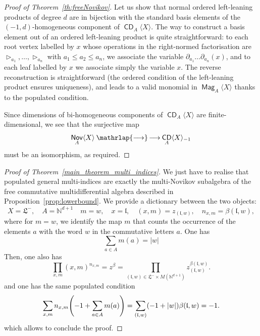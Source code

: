 \documentclass[AHL,Unicode,longabstracts]{cedram}
\newcommand{\mfl}{\mathfrak{l}}
\newcommand{\mfL}{\mathfrak{L}}
\newcommand{\bbN}{\mathbb{N}}
\DeclareMathOperator{\CDi}{\mathsf{CD}}
\DeclareMathOperator{\Nov}{\mathsf{Nov}}
\DeclareMathOperator{\Mag}{\mathsf{Mag}}
\renewcommand*{\to}{\mathchoice{\longrightarrow}{\rightarrow}{\rightarrow}{\rightarrow}}
\newcommand*{\twoheadto}
{\mathbin{\mathrlap{\to}\mkern -2mu\to}}
\let\originalleft\left
\let\originalright\right
\renewcommand{\left}{\mathopen{}\mathclose\bgroup\originalleft}
\renewcommand{\right}{\aftergroup\egroup\originalright}
\begin{document}
\begin{proof}[{Proof of Theorem~\ref{th:freeNovikov}}]
Let us show that normal ordered left-leaning products of degree $d$ are in bijection with the standard basis elements of the $(-1,d)$-homogeneous component of $\CDi_A\langle X\rangle$. The way to construct a basis element out of an ordered left-leaning product is quite straightforward: to each root vertex labelled by $x$ whose operations in the right-normed factorisation are $\triangleright_{a_1},\dots, \triangleright_{a_n}$ with $a_1\le a_2\le a_n$, we associate the variable $\partial_{a_1}\dots\partial_{a_n}(x)$, and to each leaf labelled by $x$ we associate simply the variable $x$. The reverse reconstruction is straightforward (the ordered condition of the left-leaning product ensures uniqueness), and leads to a valid monomial in $\Mag_A\langle X\rangle$ thanks to the populated condition.

Since dimensions of bi-homogeneous components of $\CDi_A\langle X\rangle$ are finite-dimensional, we see that the surjective map
\[
\Nov_A\langle X\rangle\twoheadto\CDi_A\langle X\rangle_{-1}
\]
must be an isomorphism, as required.
\end{proof}



\begin{proof}[{Proof of Theorem~\ref{main_theorem_multi_indices}}]
\label{proof_multi}
We just have to realise that populated general multi-indices are exactly the multi-Novikov subalgebra of the free commutative multidifferential algebra described in Proposition~\ref{prop:lowerbound}. We provide a dictionary between the two objects:
\begin{equation*}
X = \mfL^-, \quad A =\bbN^{d+1} \quad m = w, \quad x = \mfl, \quad (x,m) = z_{(\mfl,w)},\quad n_{x,m} = \beta(\mfl,w),
\end{equation*}
where for $m=w$, we identify the map $m$ that counts the occurrence of the elements $ a $ with the word $w$ in the commutative letters $a$. One has
\begin{equation*}
\sum_{a \in A} m(a) = |w|
\end{equation*}
Then, one also has
\begin{equation*}
\prod_{x,m}(x,m)^{n_{x,m}} = z^{\beta} = \prod_{(\mfl,w) \in \mfL^-\times M(\bbN^{d+1})} z_{(\mfl,w)}^{\beta(\mfl,w)}.
\end{equation*}
and one has the same populated condition
\[
\sum_{x,m} n_{x,m}\left(-1+\sum_{a\in A}m(a)\right) = \sum_{(\mfl,w)} (-1 + |w|)\beta(\mfl,w) =-1.
\]
which allows to conclude the proof.
\end{proof}
\end{document}
